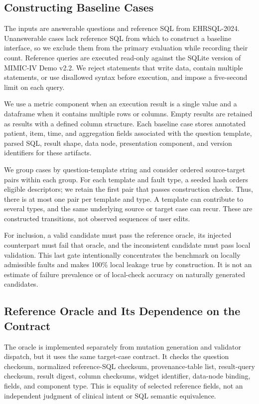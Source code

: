 \documentclass[manuscript,review,anonymous]{acmart}
\begin{document}
\subsection{Constructing Baseline Cases}

The inputs are answerable questions and reference SQL from EHRSQL-2024. Unanswerable cases lack reference SQL from which to construct a baseline interface, so we exclude them from the primary evaluation while recording their count. Reference queries are executed read-only against the SQLite version of MIMIC-IV Demo v2.2. We reject statements that write data, contain multiple statements, or use disallowed syntax before execution, and impose a five-second limit on each query.

We use a metric component when an execution result is a single value and a dataframe when it contains multiple rows or columns. Empty results are retained as results with a defined column structure. Each baseline case stores annotated patient, item, time, and aggregation fields associated with the question template, parsed SQL, result shape, data node, presentation component, and version identifiers for these artifacts.

We group cases by question-template string and consider ordered source-target pairs within each group. For each template and fault type, a seeded hash orders eligible descriptors; we retain the first pair that passes construction checks. Thus, there is at most one pair per template and type. A template can contribute to several types, and the same underlying source or target case can recur. These are constructed transitions, not observed sequences of user edits.

For inclusion, a valid candidate must pass the reference oracle, its injected counterpart must fail that oracle, and the inconsistent candidate must pass local validation. This last gate intentionally concentrates the benchmark on locally admissible faults and makes 100\% local leakage true by construction. It is not an estimate of failure prevalence or of local-check accuracy on naturally generated candidates.

\subsection{Reference Oracle and Its Dependence on the Contract}

The oracle is implemented separately from mutation generation and validator dispatch, but it uses the same target-case contract. It checks the question checksum, normalized reference-SQL checksum, provenance-table list, result-query checksum, result digest, column checksums, widget identifier, data-node binding, fields, and component type. This is equality of selected reference fields, not an independent judgment of clinical intent or SQL semantic equivalence.
\end{document}

